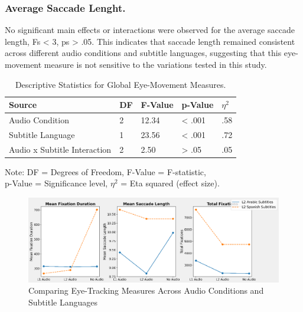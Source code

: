 \subsubsection{Average Saccade Lenght.}

No significant main effects or interactions were observed for the
average saccade length, Fs \textless{} 3, ps \textgreater{} .05. This
indicates that saccade length remained consistent across different audio
conditions and subtitle languages, suggesting that this eye-movement
measure is not sensitive to the variations tested in this study.

\begin{table}[!htbp]
\centering
\begin{threeparttable}
\caption{Descriptive Statistics for Global Eye-Movement Measures.}
\label{tab-04}
\begin{tabular}{lllll}
\toprule
Source & DF & F-Value & p-Value & $\eta^2$ \\
\midrule
Audio Condition & 2 & 12.34 & \textless{} .001 & .58 \\
Subtitle Language & 1 & 23.56 & \textless{} .001 & .72 \\
Audio x Subtitle Interaction & 2 & 2.50 & \textgreater{} .05 & .05 \\
\bottomrule
\end{tabular}
\begin{tablenotes}
\small
\item Note: {DF = Degrees of Freedom}, {F-Value = F-statistic},\\ {p-Value = Significance level}, {$\eta^2$ = Eta squared (effect size)}.
\end{tablenotes}
\end{threeparttable}
	
\end{table}

\begin{figure}[htbp]
\centering
\caption{Comparing Eye-Tracking Measures Across Audio Conditions and Subtitle Languages}
\label{fig-01}
\includegraphics[width=\textwidth]{image1}
\end{figure}

